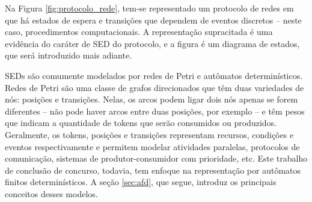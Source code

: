 
Na Figura \ref{fig:protocolo_rede}, tem-se representado um protocolo de redes em que há estados de espera e transições que dependem de eventos discretos -- neste caso, procedimentos computacionais. A representação supracitada é uma evidência do caráter de SED do protocolo, e a figura é um diagrama de estados, que será introduzido mais adiante.

SEDs são comumente modelados por redes de Petri e autômatos determinísticos. Redes de Petri são uma classe de grafos direcionados que têm duas variedades de nós: posições e transições. Nelas, os arcos podem ligar dois nós apenas se forem diferentes -- não pode haver arcos entre duas posições, por exemplo -- e têm pesos que indicam a quantidade de tokens que serão consumidos ou produzidos. Geralmente, os tokens, posições e transições representam recursos, condições e eventos respectivamente e permitem modelar atividades paralelas, protocolos de comunicação, sistemas de produtor-consumidor com prioridade, etc. \cite{petrinets} Este trabalho de conclusão de concurso, todavia, tem enfoque na representação por autômatos finitos determinísticos. A seção \ref{sec:afd}, que segue, introduz os principais conceitos desses modelos.

